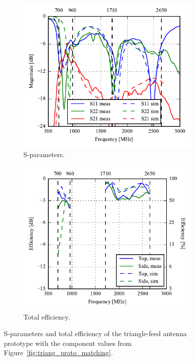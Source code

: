  \begin{figure}[htbp]
    \centering
    \begin{subfigure}{0.49\linewidth}
        \includegraphics{img/tech_sol/trianglefeed/mockup/best_sparams.pdf}
        \caption{S-parameters.}
    \end{subfigure}
    \hfill
    \begin{subfigure}{0.49\linewidth}
        \includegraphics{img/tech_sol/trianglefeed/mockup/best_efficiency.pdf}
        \caption{Total efficiency.}
    \end{subfigure}
    \caption{S-parameters and total efficiency of the triangle-feed antenna prototype with the component values from Figure~\ref{fig:triang_proto_matching}.}
    \label{fig:triang_proto_sparam_eff}
\end{figure}

